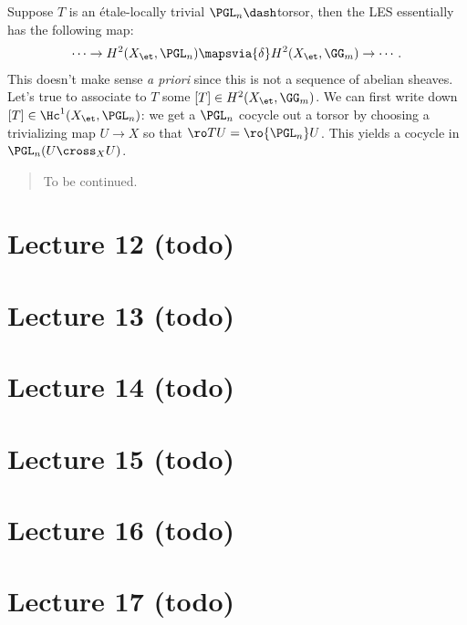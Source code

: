 Suppose \(T\) is an étale-locally trivial \(\PGL_n\dash\)torsor, then
the LES essentially has the following map:
\begin{align*}  
\cdots \to H^2(X_\et, \PGL_n) \mapsvia{\delta} H^2(X_\et, \GG_m) \to \cdots
.\end{align*} This doesn't make sense \emph{a priori} since this is not
a sequence of abelian sheaves. Let's true to associate to \(T\) some
\([T]\in H^2(X_\et, \GG_m)\). We can first write down
\([T] \in \Hc^1(X_\et, \PGL_n)\): we get a \(\PGL_n\) cocycle out a
torsor by choosing a trivializing map \(U\to X\) so that
\(\ro T U = \ro {\PGL_n} U\). This yields a cocycle in
\(\PGL_n(U\cross_X U)\).

\begin{quote}
To be continued.
\end{quote}

\hypertarget{lecture-12-todo}{%
\section{Lecture 12 (todo)}\label{lecture-12-todo}}

\hypertarget{lecture-13-todo}{%
\section{Lecture 13 (todo)}\label{lecture-13-todo}}

\hypertarget{lecture-14-todo}{%
\section{Lecture 14 (todo)}\label{lecture-14-todo}}

\hypertarget{lecture-15-todo}{%
\section{Lecture 15 (todo)}\label{lecture-15-todo}}

\hypertarget{lecture-16-todo}{%
\section{Lecture 16 (todo)}\label{lecture-16-todo}}

\hypertarget{lecture-17-todo}{%
\section{Lecture 17 (todo)}\label{lecture-17-todo}}

